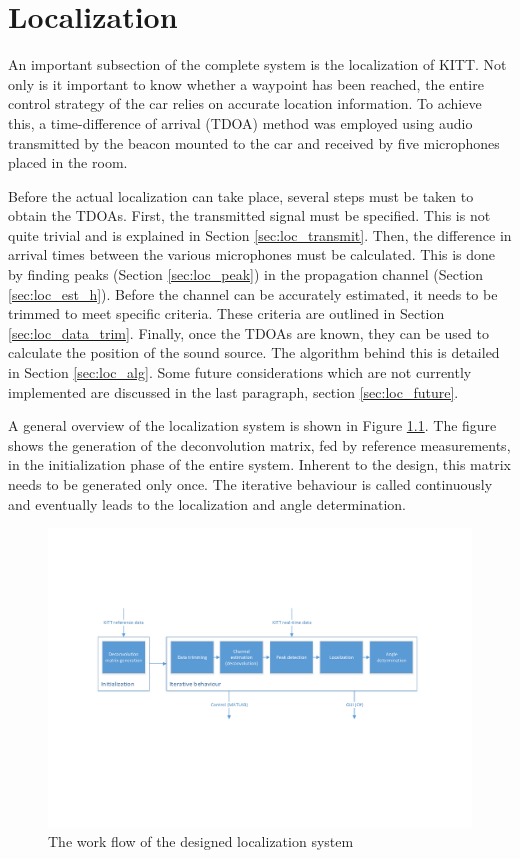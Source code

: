\documentclass[11pt,titlepage]{report}
\begin{document}
\chapter{Localization}
\label{ch:localization}
An important subsection of the complete system is the localization of KITT. Not only is it important to know whether a waypoint has been reached, the entire control strategy of the car relies on accurate location information. To achieve this, a time-difference of arrival (TDOA) method was employed using audio transmitted by the beacon mounted to the car and received by five microphones placed in the room.

Before the actual localization can take place, several steps must be taken to obtain the TDOAs. First, the transmitted signal must be specified. This is not quite trivial and is explained in Section \ref{sec:loc_transmit}. Then, the difference in arrival times between the various microphones must be calculated. This is done by finding peaks (Section \ref{sec:loc_peak}) in the propagation channel (Section \ref{sec:loc_est_h}). Before the channel can be accurately estimated, it needs to be trimmed to meet specific criteria. These criteria are outlined in Section \ref{sec:loc_data_trim}. Finally, once the TDOAs are known, they can be used to calculate the position of the sound source. The algorithm behind this is detailed in Section \ref{sec:loc_alg}. Some future considerations which are not currently implemented are discussed in the last paragraph, section \ref{sec:loc_future}.

A general overview of the localization system is shown in Figure \ref{fig:localization-overview}. The figure shows the generation of the deconvolution matrix, fed by reference measurements, in the initialization phase of the entire system. Inherent to the design, this matrix needs to be generated only once. The iterative behaviour is called continuously and eventually leads to the localization and angle determination.
\begin{figure}[H]
	\centering
	\includegraphics[width=\linewidth]{resource/localization-overview.pdf}
	\caption{The work flow of the designed localization system}
	\label{fig:localization-overview}
\end{figure}
\end{document}

